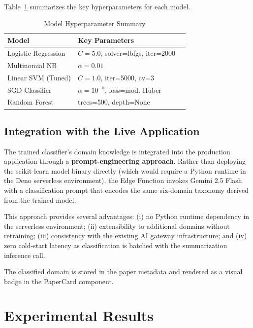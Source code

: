 \documentclass[conference]{IEEEtran}
\begin{document}
Table~\ref{tab:hyperparams} summarizes the key hyperparameters for each model.

\begin{table}[htbp]
\caption{Model Hyperparameter Summary}
\label{tab:hyperparams}
\centering
\begin{tabular}{@{}lll@{}}
\toprule
\textbf{Model} & \textbf{Key Parameters} \\
\midrule
Logistic Regression & $C=5.0$, solver=lbfgs, iter=2000 \\
Multinomial NB & $\alpha=0.01$ \\
Linear SVM (Tuned) & $C=1.0$, iter=5000, cv=3 \\
SGD Classifier & $\alpha=10^{-5}$, loss=mod. Huber \\
Random Forest & trees=500, depth=None \\
\bottomrule
\end{tabular}
\end{table}

\subsection{Integration with the Live Application}

The trained classifier's domain knowledge is integrated into the production application through a \textbf{prompt-engineering approach}. Rather than deploying the scikit-learn model binary directly (which would require a Python runtime in the Deno serverless environment), the Edge Function invokes Gemini 2.5 Flash with a classification prompt that encodes the same six-domain taxonomy derived from the trained model.

This approach provides several advantages: (i) no Python runtime dependency in the serverless environment; (ii) extensibility to additional domains without retraining; (iii) consistency with the existing AI gateway infrastructure; and (iv) zero cold-start latency as classification is batched with the summarization inference call.

The classified domain is stored in the paper metadata and rendered as a visual badge in the PaperCard component.

\section{Experimental Results}
\end{document}
